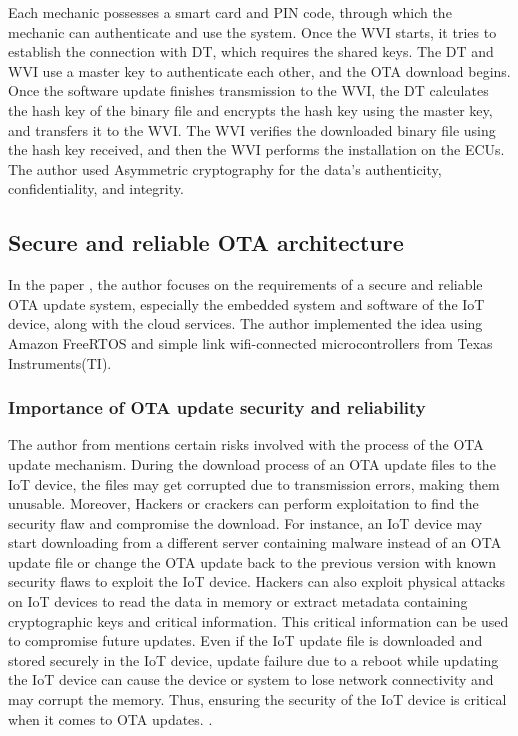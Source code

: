 \documentclass[12pt,a4paper]{article}
\begin{document}
Each mechanic possesses a smart card and PIN code, through which the mechanic can authenticate and use the system. Once the WVI starts, it tries to establish the connection with DT, which requires the shared keys. The DT and WVI use a master key to authenticate each other, and the OTA download begins. Once the software update finishes transmission to the WVI, the DT calculates the hash key of the binary file and encrypts the hash key using the master key, and transfers it to the WVI. The WVI verifies the downloaded binary file using the hash key received, and then the WVI performs the installation on the ECUs. The author used Asymmetric cryptography for the data's authenticity, confidentiality, and integrity.\cite{r3}

\subsection{Secure and reliable OTA architecture}

In the paper \cite{r27}, the author focuses on the requirements of a secure and reliable OTA update system, especially the embedded system and software of the IoT device, along with the cloud services. The author implemented the idea using  Amazon FreeRTOS and simple link wifi-connected microcontrollers from Texas Instruments(TI).

\subsubsection{Importance of OTA update security and reliability }

The author from \cite{r27} mentions certain risks involved with the process of the OTA update mechanism. During the download process of an OTA update files to the IoT device, the files may get corrupted due to transmission errors, making them unusable. Moreover, Hackers or crackers can perform exploitation to find the security flaw and compromise the download. For instance, an IoT device may start downloading from a different server containing malware instead of an OTA update file or change the OTA update back to the previous version with known security flaws to exploit the IoT device. Hackers can also exploit physical attacks on IoT devices to read the data in memory or extract metadata containing cryptographic keys and critical information. This critical information can be used to compromise future updates. Even if the IoT update file is downloaded and stored securely in the IoT device, update failure due to a reboot while updating the IoT device can cause the device or system to lose network connectivity and may corrupt the memory. Thus, ensuring the security of the IoT device is critical when it comes to OTA updates. \cite{r27}. \\
\end{document}
